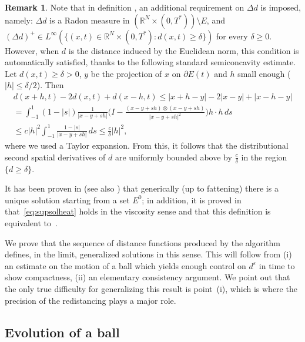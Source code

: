 \documentclass[10pt]{amsart}
\theoremstyle{plain}
\theoremstyle{definition}
\newtheorem{remark}[theorem]{Remark}
\newcommand{\R}{\mathbb{R}}
\newcommand{\e}{\varepsilon}
\numberwithin{equation}{section}
\begin{document}
\begin{remark}
Note that in definition \cite[Def.~2.2]{CMNP19}, an additional requirement on $\Delta d$ is imposed, namely:  $\Delta d$ is a Radon measure in $(\R^N\times (0,T^*))\setminus E$,     and $(\Delta d)^+ \in L^\infty(\{(x,t)\in\R^N\times (0,T^*):
d(x,t)\ge \delta\})$ for every $\delta\ge 0$. However, when $d$ is the distance induced by the Euclidean norm, this condition is automatically satisfied, thanks to the following standard semiconcavity estimate. Let $d(x,t)\ge \delta>0$,  $y$ be the projection of $x$ on $\partial E(t)$ and $h$ small enough ($|h|\le \delta/2$). Then 
\begin{multline*}           
    d(x+h,t)-2d(x,t)+d(x-h,t)\le |x+h-y| - 2|x-y|+ |x-h-y|\\
    = \int_{-1}^1 (1-| {s}|)\frac1{|x-y+ {s}h|}\Big(I-\frac{(x-y+ {s}h)\otimes (x-y+ {s}h)}{|x-y+ {s}h|^2}\Big) h\cdot h \, d {s}\\
    \le      c|h|^2 \int_{-1}^1 \frac{1-| {s}|}{ {|x-y+ {s}h|}} \, d {s}
    \le \frac{c}{\delta}|h|^2,
\end{multline*}
{where we used a Taylor expansion.
From this, it}
follows that the distributional  second  spatial derivatives of $d$ are uniformly bounded above by $\frac c\delta$ in the region $\{d\ge \delta\}$.
\end{remark}


It has been proven in \cite{CMP17} (see also \cite{ChaMorNovPon19}) that generically (up to fattening) there is a unique solution starting from a set $E^0$;
in addition, it is proved in~\cite[Appendix]{CMP17} that~\eqref{eq:supsolheat} holds in the viscosity sense
and that this definition is equivalent to~\cite[Def.~5.1]{Soner93}.

We prove that the sequence of distance functions produced
by the algorithm defines, in the limit, generalized solutions
 {in  this} sense.
This will follow from (i) an estimate on the motion of a ball which yields enough
control on $d^\e$ in time to show compactness, (ii) an elementary
consistency argument. We point out that the only true difficulty for generalizing
this result is point~(i),
which is where the precision of the redistancing plays a major role.
 
\subsection{Evolution of a ball}
\end{document}
